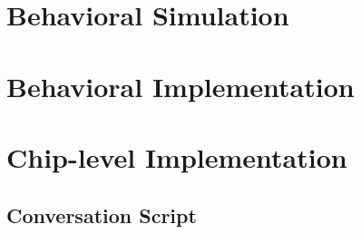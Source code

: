 \section{Behavioral Simulation}
\section{Behavioral Implementation}
\section{Chip-level Implementation}
\subsection{Conversation Script}